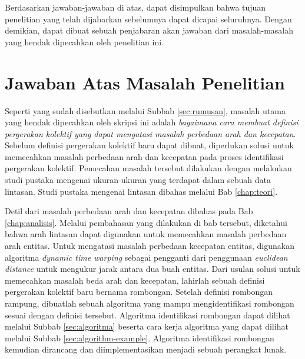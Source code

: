 Berdasarkan jawaban-jawaban di atas, dapat disimpulkan bahwa tujuan penelitian yang telah dijabarkan sebelumnya dapat dicapai seluruhnya. Dengan demikian, dapat dibuat sebuah penjabaran akan jawaban dari masalah-masalah yang hendak dipecahkan oleh penelitian ini.

\section{Jawaban Atas Masalah Penelitian}
\label{sec:jawaban-masalah}

Seperti yang sudah disebutkan melalui Subbab \ref{sec:rumusan}, masalah utama yang hendak dipecahkan oleh skripsi ini adalah \textit{bagaimana cara membuat definisi pergerakan kolektif yang dapat mengatasi masalah perbedaan arah dan kecepatan}. Sebelum definisi pergerakan kolektif baru dapat dibuat, diperlukan solusi untuk memecahkan masalah perbedaan arah dan kecepatan pada proses identifikasi pergerakan kolektif. Pemecahan masalah tersebut dilakukan dengan melakukan studi pustaka mengenai ukuran-ukuran yang terdapat dalam sebuah data lintasan. Studi pustaka mengenai lintasan dibahas melalui Bab \ref{chap:teori}.

\iffalse
item Bagaimana cara membuat definisi pergerakan kolektif yang dapat mengatasi masalah perbedaan arah dan kecepatan?
    \item Bagaimana cara membuat algoritma untuk mengidentifikasi pergerakan kolektif yang sesuai dengan definisi pergerakan kolektif yang dibuat?
    \item Bagaimana cara memvisualiasikan hasil identifikasi rombongan di dalam video rekaman data pejalan kaki?
    \item Seberapa efektifkah definisi formal pergerakan kolektif yang dibuat dalam menyelesaikan masalah perbedaan arah dan kecepatan pada identifikasi pergerakan kolektif?
    
\fi

Detil dari masalah perbedaan arah dan kecepatan dibahas pada Bab \ref{chap:analisis}. Melalui pembahasan yang dilakukan di bab tersebut, diketahui bahwa arah lintasan dapat digunakan untuk memecahkan masalah perbedaan arah entitas. Untuk mengatasi masalah perbedaan kecepatan entitas, digunakan algoritma \textit{dynamic time warping} sebagai pengganti dari penggunaan \textit{euclidean distance} untuk mengukur jarak antara dua buah entitas. Dari usulan solusi untuk memecahkan masalah beda arah dan kecepatan, lahirlah sebuah definisi pergerakan kolektif baru bernama rombongan. Setelah definisi rombongan rampung, dibuatlah sebuah algoritma yang mampu mengidentifikasi rombongan sesuai dengan definisi tersebut. Algoritma identifikasi rombongan dapat dilihat melalui Subbab \ref{sec:algoritma} beserta cara kerja algoritma yang dapat dilihat melalui Subbab \ref{sec:algorithm-example}. Algoritma identifikasi rombongan kemudian dirancang dan diimplementasikan menjadi sebuah perangkat lunak.

